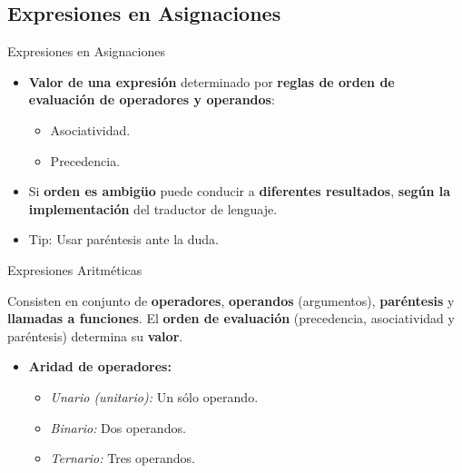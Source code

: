 \documentclass{beamer}
\begin{document}
\subsection{Expresiones en Asignaciones}

\begin{frame}[fragile]{Expresiones en Asignaciones}
\begin{itemize}
	\item \textbf{Valor de una expresión} determinado por \textbf{reglas de orden de evaluación de operadores y operandos}:
	\begin{itemize}
		\item Asociatividad.
		\item Precedencia.
	\end{itemize}
	\item Si \textbf{orden es ambigüo} puede conducir a \textbf{diferentes resultados}, \textbf{según la implementación} del traductor de lenguaje.
	\item Tip: Usar paréntesis ante la duda.
\end{itemize}
\end{frame}

\begin{frame}[fragile]{Expresiones Aritméticas}
\begin{block}{}
	Consisten en conjunto de \textbf{operadores}, \textbf{operandos} (argumentos), \textbf{paréntesis} y \textbf{llamadas a funciones}. El \textbf{orden de evaluación} (precedencia, asociatividad y paréntesis) determina su \textbf{valor}. 
\end{block}
\bigskip
\begin{itemize}
	\large
	\item \textbf{Aridad de operadores:}
	\begin{itemize}
		\large
		\item \emph{Unario (unitario):} Un sólo operando.
		\item \emph{Binario:}  Dos operandos.
		\item \emph{Ternario:} Tres operandos.
	\end{itemize}
\end{itemize}
\end{frame}
\end{document}
